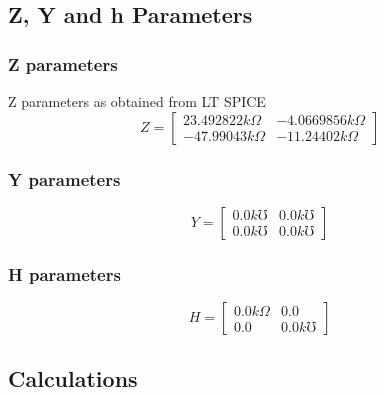 \documentclass{article}[12pt]
\begin{document}
\subsection*{Z, Y and h Parameters}
\subsubsection*{Z parameters}
Z parameters as obtained from LT SPICE
$$ Z = \begin{bmatrix}
        23.492822k\Omega & -4.0669856k\Omega \\
        -47.99043k\Omega & -11.24402k \Omega
    \end{bmatrix}
$$
\subsubsection*{Y parameters}
$$ Y = \begin{bmatrix} %
        0.0k\mho & 0.0k\mho \\
        0.0k\mho & 0.0k\mho
    \end{bmatrix}
$$
\subsubsection*{H parameters}
$$ H = \begin{bmatrix} %
        0.0k\Omega & 0.0      \\
        0.0        & 0.0k\mho
    \end{bmatrix}
$$
\newpage
\subsection*{Calculations}
\end{document}

